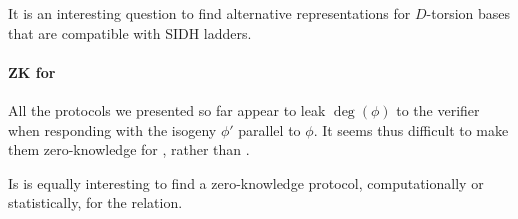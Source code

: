 It is an interesting question to find alternative representations for
$D$-torsion bases that are compatible with SIDH ladders.

\paragraph{ZK for \R[isog]}
All the protocols we presented so far appear to leak $\deg(\phi)$ to
the verifier when responding with the isogeny $\phi'$ parallel to
$\phi$. It seems thus difficult to make them zero-knowledge for
\R[isog], rather than \R[deg].

Is is equally interesting to find a zero-knowledge protocol,
computationally or statistically, for the \R[isog] relation.
